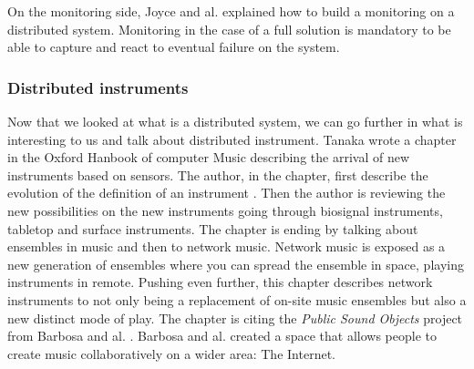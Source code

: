 On the monitoring side, Joyce and al. \cite{joyceMonitoringDistributedSystems} explained how to build a monitoring
on a distributed system. Monitoring in the case of a full solution is mandatory to be able to capture and react to eventual
failure on the system.


\subsubsection{Distributed instruments}

Now that we looked at what is a distributed system, we can go further in what is interesting to us and talk about 
distributed instrument. Tanaka wrote a chapter in the Oxford Hanbook of computer Music \cite{deanOxfordHandbookComputer2009} 
describing the arrival of new instruments based on sensors.
The author, in the chapter, first describe the evolution of the definition of an instrument \cite{tanaka2009sensor}.
Then the author is reviewing the new possibilities on the new instruments going through biosignal instruments, tabletop
and surface instruments. The chapter is ending by talking about ensembles in music and then to network music.
Network music is exposed as a new generation of ensembles where you can spread the ensemble in space, playing
instruments in remote. Pushing even further, this chapter describes network instruments to not only being a replacement
of on-site music ensembles but also a new distinct mode of play.
The chapter is citing the \textit{Public Sound Objects} project from Barbosa and al. \cite{barbosaPublicSoundObjects2002}.
Barbosa and al. created a space that allows people to create music collaboratively on a wider area: The Internet.


